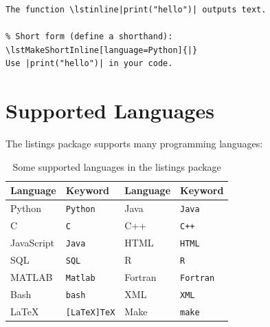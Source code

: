 \begin{lstlisting}[language={[LaTeX]TeX}, caption=Inline code]
% Use \lstinline for inline code:
The function \lstinline|print("hello")| outputs text.

% Short form (define a shorthand):
\lstMakeShortInline[language=Python]{|}
Use |print("hello")| in your code.
\end{lstlisting}

\section{Supported Languages}

The listings package supports many programming languages:

\begin{table}[H]
\centering
\begin{tabular}{llll}
\toprule
\textbf{Language} & \textbf{Keyword} & \textbf{Language} & \textbf{Keyword} \\
\midrule
Python     & \texttt{Python}        & Java      & \texttt{Java} \\
C          & \texttt{C}             & C++       & \texttt{C++} \\
JavaScript & \texttt{Java}          & HTML      & \texttt{HTML} \\
SQL        & \texttt{SQL}           & R         & \texttt{R} \\
MATLAB     & \texttt{Matlab}        & Fortran   & \texttt{Fortran} \\
Bash       & \texttt{bash}          & XML       & \texttt{XML} \\
LaTeX      & \texttt{[LaTeX]TeX}    & Make      & \texttt{make} \\
\bottomrule
\end{tabular}
\caption{Some supported languages in the listings package}
\end{table}
